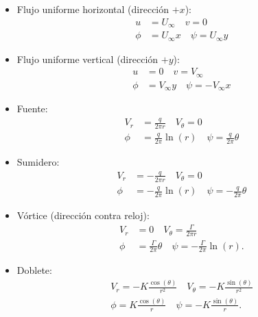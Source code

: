 \begin{itemize}
\item Flujo uniforme horizontal (dirección $+x$):
\begin{align}
u &= U_\infty \quad v = 0 \nonumber \\
\phi&= U_\infty x \quad \psi= U_\infty y
\end{align}

\item Flujo uniforme vertical (dirección $+y$):
\begin{align}
u &= 0 \quad v = V_\infty \nonumber \\
\phi&= V_\infty y \quad \psi= -V_\infty x
\end{align}

\item Fuente:
\begin{align}
V_r &= \frac{q}{2\pi r}\quad V_\theta=0\nonumber\\
\phi&=\frac{q}{2\pi}\ln(r) \quad \psi=\frac{q}{2\pi}\theta
\end{align}

\item Sumidero:
\begin{align}
V_r &= -\frac{q}{2\pi r}\quad V_\theta=0\nonumber\\
\phi&=-\frac{q}{2\pi}\ln(r) \quad \psi=-\frac{q}{2\pi}\theta
\end{align}

\item Vórtice (dirección contra reloj):
\begin{align}
V_r &= 0 \quad V_\theta=\frac{\Gamma}{2\pi r}\nonumber\\
\phi&=\frac{\Gamma}{2\pi}\theta \quad \psi = -\frac{\Gamma}{2\pi}\ln(r).
\end{align}

\item Doblete: 
\begin{align}
V_r = -K\frac{\cos(\theta)}{r^2}\quad V_\theta = -K\frac{\sin(\theta)}{r^2}\nonumber\\
\phi=K\frac{\cos(\theta)}{r}\quad \psi = -K\frac{\sin(\theta)}{r}.
\end{align}

\end{itemize}

